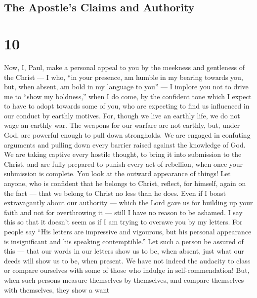 \hypertarget{the-apostles-claims-and-authority}{%
\subsection{The Apostle's Claims and
Authority}\label{the-apostles-claims-and-authority}}

\hypertarget{section-8}{%
\section{10}\label{section-8}}

 Now, I, Paul, make a personal appeal to you by the meekness
and gentleness of the Christ --- I who, ``in your presence, am humble in
my bearing towards you, but, when absent, am bold in my language to
you'' ---  I implore you not to drive me to ``show my
boldness,'' when I do come, by the confident tone which I expect to have
to adopt towards some of you, who are expecting to find us influenced in
our conduct by earthly motives.  For, though we live an
earthly life, we do not wage an earthly war.  The weapons
for our warfare are not earthly, but, under God, are powerful enough to
pull down strongholds.  We are engaged in confuting
arguments and pulling down every barrier raised against the knowledge of
God. We are taking captive every hostile thought, to bring it into
submission to the Christ,  and are fully prepared to punish
every act of rebellion, when once your submission is complete.
 You look at the outward appearance of things! Let anyone,
who is confident that he belongs to Christ, reflect, for himself, again
on the fact --- that we belong to Christ no less than he does.
 Even if I boast extravagantly about our authority --- which
the Lord gave us for building up your faith and not for overthrowing it
--- still I have no reason to be ashamed.  I say this so
that it doesn't seem as if I am trying to overawe you by my letters.
 For people say ``His letters are impressive and vigourous,
but his personal appearance is insignificant and his speaking
contemptible.''  Let such a person be assured of this ---
that our words in our letters show us to be, when absent, just what our
deeds will show us to be, when present.  We have not indeed
the audacity to class or compare ourselves with some of those who
indulge in self-commendation! But, when such persons measure themselves
by themselves, and compare themselves with themselves, they show a want
